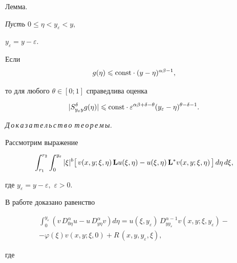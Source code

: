 \smallskip



{\small \sc Лемма.} {\it Пусть $0\leqslant \eta < y_{\varepsilon} < y,$ 

$y_{\varepsilon}=y-\varepsilon.$ 

Если $$g(\eta) \leqslant \text{\rm const}\cdot (y-\eta)^{\alpha\beta-1},$$ 

то для любого $\theta\in[0; 1]$ справедлива оценка

$$

|S_{y_{\varepsilon}y}^{\delta}g(\eta)|\leqslant \text{\rm const}\cdot 

\varepsilon^{\alpha\beta+\delta-\theta}(y_{\varepsilon}-\eta)^{\theta-\delta-1}.

$$

}



\smallskip



{\it  Д\,о\,к\,а\,з\,а\,т\,е\,л\,ь\,с\,т\,в\,о\/ т\,е\,о\,р\,е\,м\,ы.} 

Рассмотрим выражение

\begin{equation} \label{GGrina}

\int _{r_1}^{r_2}\int _{0}^{y_{\varepsilon}}

|\xi|^{b}\big[\,v(x,y;\xi,\eta)\,{\bf L}u(\xi,\eta)-u(\xi,\eta)\,{\bf L}^{*}v(x,y;\xi,\eta)\,\big]\, d\eta\,d\xi,

\end{equation}

где $y_{\varepsilon}=y-\varepsilon,$ $\varepsilon>0.$



В работе \cite[c. 121]{Pskhu} доказано равенство

\begin{multline}

\int _{0}^{y_{\varepsilon}}\left(v\,D^{\alpha}_{0\eta}u-

u\,D^{\alpha}_{y\eta}v\right)d\eta=

u(\xi,y_{\varepsilon})\,D^{\alpha-1}_{yy_{\varepsilon}}v(x,y;\xi,y_{\varepsilon})-

\\ \label{Pskhu1}

-\varphi(\xi)v(x,y;\xi,0)+R\,(x,y,y_{\varepsilon},\xi),

\end{multline}

где 

$$

